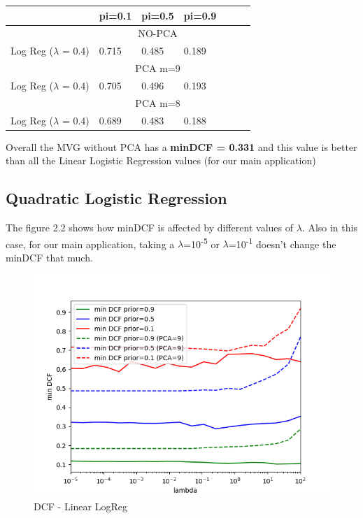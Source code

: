 \documentclass[english]{report}
\begin{document}
\begin{table}[H]
    \centering
    
    \begin{tabular}{lllllll}
        \hline
                                & pi=0.1 & pi=0.5 & pi=0.9 \\ \hline
                                & \multicolumn{3}{c}{NO-PCA}  \\
    Log Reg ($\lambda$ = 0.4)   & 0.715      & 0.485      & 0.189      \\
                                & \multicolumn{3}{c}{PCA m=9}  \\
    Log Reg ($\lambda$ = 0.4)   & 0.705      & 0.496       & 0.193       \\
                                & \multicolumn{3}{c}{PCA m=8}  \\
    Log Reg ($\lambda$ = 0.4)   & 0.689       & 0.483       & 0.188       \\
    \hline
    \end{tabular}
\end{table}

Overall the MVG without PCA has a \textbf{minDCF = 0.331} and this value is better than all 
the Linear Logistic Regression values (for our main application)

\clearpage

\subsection{Quadratic Logistic Regression}

The figure 2.2 shows how minDCF is affected by different values of $\lambda$. Also in this case, for
our main application, taking a $\lambda$=10\textsuperscript{-5} or $\lambda$=10\textsuperscript{-1}
doesn't change the minDCF that much.

\begin{figure}[H]
    \centering
    \includegraphics[scale=0.5]{../../images/validation/QUAD_LR_PCA_minDCF_comparison}
    \caption{DCF - Linear LogReg}
    \label{DCF - Linear LogReg}
\end{figure}
\end{document}
